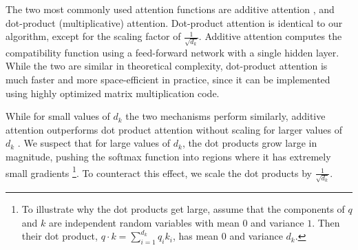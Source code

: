 \documentclass{article}
\begin{document}
The two most commonly used attention functions are additive attention \citep{bahdanau2014neural}, and dot-product (multiplicative) attention.  Dot-product attention is identical to our algorithm, except for the scaling factor of $\frac{1}{\sqrt{d_k}}$. Additive attention computes the compatibility function using a feed-forward network with a single hidden layer.  While the two are similar in theoretical complexity, dot-product attention is much faster and more space-efficient in practice, since it can be implemented using highly optimized matrix multiplication code. 




While for small values of $d_k$ the two mechanisms perform similarly, additive attention outperforms dot product attention without scaling for larger values of $d_k$ \citep{DBLP:journals/corr/BritzGLL17}. We suspect that for large values of $d_k$, the dot products grow large in magnitude, pushing the softmax function into regions where it has extremely small gradients  \footnote{To illustrate why the dot products get large, assume that the components of $q$ and $k$ are independent random variables with mean $0$ and variance $1$.  Then their dot product, $q \cdot k = \sum_{i=1}^{d_k} q_ik_i$, has mean $0$ and variance $d_k$.}. To counteract this effect, we scale the dot products by $\frac{1}{\sqrt{d_k}}$.


\end{document}
